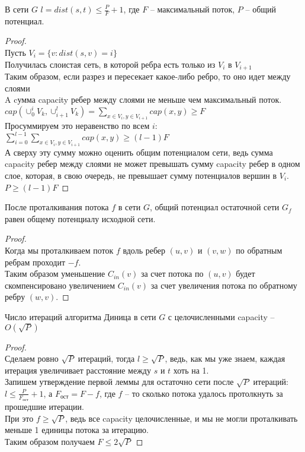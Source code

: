 \begin{lemma}
	В сети $G$ $l = dist(s, t) \leq \frac{P}{F} + 1$, где $F$ -- максимальный поток, $P$ -- общий потенциал. 
\end{lemma}
\begin{proof} \ \\
	Пусть $V_i = \{v: dist(s, v) = i\}$ \\
	Получилась слоистая сеть, в которой ребра есть только из  $V_i$ в  $V_{i + 1}$ \\
	Таким образом, если разрез и пересекает какое-либо ребро, то оно идет между слоями \\
	A cумма capacity ребер между слоями не меньше чем максимальный поток. \\ 
	$cap(\cup_0^i V_k, \cup_{i + 1}^l V_k) = \sum\limits_{x \in V_i, y \in V_{i + 1}} cap(x, y) \geq F$ \\
	Просуммируем это неравенство по всем $i$: \\
	$\sum\limits_{i = 0}^{l - 1} \sum\limits_{x \in V_i, y \in V_{i + 1}} cap(x, y) \geq (l - 1)F$ \\
	А сверху эту сумму можно оценить общим потенциалом сети, ведь сумма capacity ребер между слоями не может превышать сумму capacity ребер в одном слое, которая, в свою очередь, не превышает сумму потенциалов вершин в $V_i$. \\
	$P \geq (l - 1)F$
\end{proof}

\begin{lemma}
	После проталкивания потока $f$	в сети $G$, общий потенциал остаточной сети  $G_f$ равен общему потенциалу исходной сети.
\end{lemma}
\begin{proof} \ \\
	Когда мы проталкиваем поток $f$ вдоль ребер $(u, v)$ и $(v, w)$ по обратным ребрам проходит $-f$. \\
	Таким образом уменьшение $C_{in}(v)$ за счет потока по $(u, v)$ будет скомпенсировано увеличением  $C_{in}(v)$ за счет увеличения потока по обратному ребру  $(w, v)$.
\end{proof}

\begin{theorem}
	Число итераций алгоритма Диница в сети $G$ с целочисленными capacity --  $O(\sqrt{P})$
\end{theorem}
\begin{proof} \ \\
	Сделаем ровно $\sqrt{P}$ итераций, тогда $l \geq \sqrt{P}$, ведь, как мы уже знаем, каждая итерация увеличивает расстояние между $s$ и $t$ хоть на 1. \\
	Запишем утверждение первой леммы для остаточно сети после $\sqrt P$ итераций: \\
	$l \leq  \frac{P}{F_{ост}} + 1$, а $F_{ост} = F - f$, где $f$ -- то сколько потока удалось протолкнуть за прошедшие итерации. \\
	При это $f \geq \sqrt P$, ведь все capacity целочисленные, и мы не могли проталкивать меньше 1 единицы потока за итерацию. \\
	Таким образом получаем $F \leq 2\sqrt{P}$ 
\end{proof}
